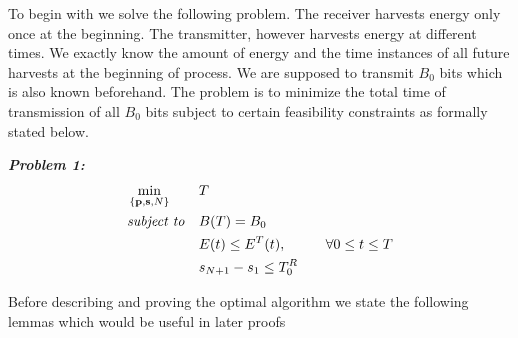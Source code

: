 To begin with we solve the following problem. The receiver harvests energy only once at the beginning. The transmitter, however harvests energy at different times. We exactly know the amount of energy and the time instances of all future harvests at the beginning of process.  We are supposed to transmit $B_0$ bits which is also known beforehand. The problem is to minimize the total time of transmission of all $B_0$ bits subject to certain feasibility constraints as formally stated below.

\textbf{\textit{Problem 1:}}
\begin{align}
&\min_{\{\textbf{p},\textbf{s},N\}}			&& T
\\
&\text{\textit{subject to}} 				&& B(T)=B_0
\\
&     										&& E(t)\le E^T(t),  		&&& \forall 0\le t\le T
\\
&    										&& s_{N+1}-s_1\le T^R_0
\end{align}

Before describing and proving the optimal algorithm we state the following lemmas which would be useful in later proofs



